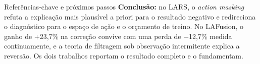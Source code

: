 \documentclass[aspectratio=169]{beamer}
\begin{document}
\begin{frame}{Referências-chave e próximos passos}
\vspace{0.05cm}
\textbf{Conclusão:} no LARS, o \emph{action masking} refuta a explicação mais plausível a priori para o resultado negativo e redireciona o diagnóstico para o espaço de ação e o orçamento de treino. No LAFusion, o ganho de +23,7\% na correção convive com uma perda de $-$12,7\% medida continuamente, e a teoria de filtragem sob observação intermitente explica a reversão. Os dois trabalhos reportam o resultado completo e o fundamentam.
\end{frame}
\end{document}
